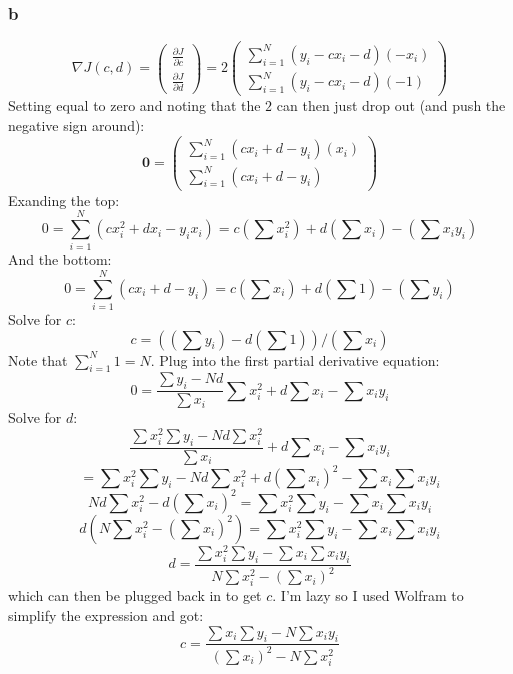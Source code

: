 \documentclass[11pt]{report}
\theoremstyle{definition}
\begin{document}
\subsubsection*{b}
\[
	\nabla J(c, d) = \begin{pmatrix}
		\frac{\partial J}{\partial c} \\
		\frac{\partial J}{\partial d}
	\end{pmatrix}
	=
	2\begin{pmatrix}
		\sum_{i=1}^{N}\left(y_i-cx_i-d\right)(-x_i) \\
		\sum_{i=1}^{N}\left(y_i-cx_i-d\right)(-1)
	\end{pmatrix}
\]
Setting equal to zero and noting that the $2$ can then just drop out (and push the negative sign around):
\[
	\mathbf{0} = \begin{pmatrix}
		\sum_{i=1}^{N}\left(cx_i+d-y_i\right)(x_i) \\
		\sum_{i=1}^{N}\left(cx_i+d-y_i\right)
	\end{pmatrix}
\]
Exanding the top:
\[
	0
	= \sum_{i=1}^N(cx_i^2+dx_i-y_ix_i)
	= c\left(\sum x_i^2\right) + d \left(\sum x_i\right) - \left(\sum x_iy_i\right)
\]
And the bottom:
\[
	0
	= \sum_{i=1}^N(cx_i+d-y_i)
	= c\left(\sum x_i\right) + d\left(\sum 1\right) - \left(\sum y_i\right)
\]
Solve for $c$:
\[
	c = \left(\left(\sum y_i\right)- d\left(\sum 1\right)\right)/ \left(\sum x_i\right)
\]
Note that $\sum_{i=1}^N 1 = N$.
Plug into the first partial derivative equation:
\[ 0=\frac{\sum y_i - Nd}{\sum x_i} \sum x_i^2 + d\sum{x_i}-\sum{x_iy_i} \]
Solve for $d$:
\[ \frac{\sum x_i^2\sum y_i - Nd\sum x_i^2}{\sum x_i} + d\sum x_i - \sum x_iy_i \]
\[=\sum x_i^2\sum y_i - Nd\sum x_i^2 + d\left(\sum x_i\right)^2-\sum x_i\sum x_iy_i\]
\[Nd\sum x_i^2 - d\left(\sum x_i\right)^2 = \sum x_i^2\sum y_i - \sum x_i\sum x_iy_i\]
\[d \left(N\sum x_i^2 - \left(\sum x_i\right)^2\right) = \sum x_i^2\sum y_i - \sum x_i\sum x_iy_i\]
\[ d = \frac{\sum x_i^2\sum y_i - \sum x_i\sum x_iy_i}{N\sum x_i^2 - \left(\sum x_i\right)^2 } \]
which can then be plugged back in to get $c$. I'm lazy so I used Wolfram to
simplify the expression and got:
\[ c = \frac{\sum x_i\sum y_i - N \sum x_iy_i}{\left(\sum x_i\right)^2-N\sum x_i^2} \]
\end{document}
